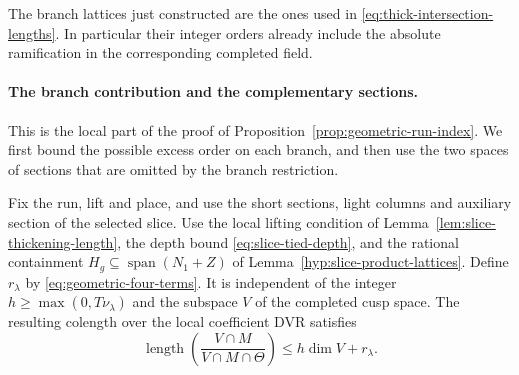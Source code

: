 


The branch lattices just constructed are the ones used in
\eqref{eq:thick-intersection-lengths}. In particular their
integer orders already include the absolute ramification
in the corresponding completed field.

\paragraph{The branch contribution and the complementary sections.}
This is the local part of the proof of
Proposition~\ref{prop:geometric-run-index}. We first bound
the possible excess order on each branch, and then use the
two spaces of sections that are omitted by the branch
restriction.
\begin{proposition}\label{prop:local-product-colength}
Fix the run, lift and place, and use the short sections,
light columns and auxiliary section of the selected slice.
Use the local lifting condition of
Lemma~\ref{lem:slice-thickening-length}, the depth bound
\eqref{eq:slice-tied-depth}, and the rational containment
\(H_g\subseteq\operatorname{span}(N_1+Z)\) of
Lemma~\ref{hyp:slice-product-lattices}. Define \(r_\lambda\) by
\eqref{eq:geometric-four-terms}. It is independent of the
integer \(h\ge\max(0,T\nu_\lambda)\) and the subspace \(V\)
of the completed cusp space. The resulting colength over the local coefficient DVR satisfies
\[
 \operatorname{length}\!\left(\frac{V\cap M}{V\cap M\cap\Theta}\right)
      \le h\dim V+r_\lambda .
\]
\end{proposition}


